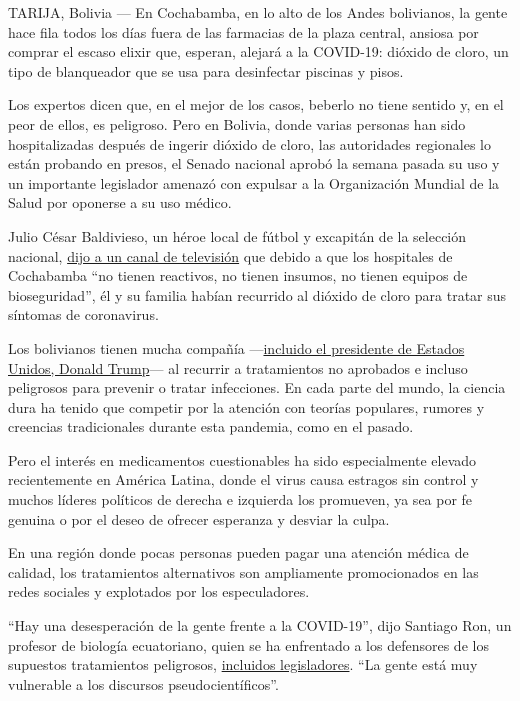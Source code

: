 TARIJA, Bolivia --- En Cochabamba, en lo alto de los Andes bolivianos,
la gente hace fila todos los días fuera de las farmacias de la plaza
central, ansiosa por comprar el escaso elixir que, esperan, alejará a la
COVID-19: dióxido de cloro, un tipo de blanqueador que se usa para
desinfectar piscinas y pisos.

Los expertos dicen que, en el mejor de los casos, beberlo no tiene
sentido y, en el peor de ellos, es peligroso. Pero en Bolivia, donde
varias personas han sido hospitalizadas después de ingerir dióxido de
cloro, las autoridades regionales lo están probando en presos, el Senado
nacional aprobó la semana pasada su uso y un importante legislador
amenazó con expulsar a la Organización Mundial de la Salud por oponerse
a su uso médico.

Julio César Baldivieso, un héroe local de fútbol y excapitán de la
selección nacional,
\href{https://www.facebook.com/watch/live/?v=214675996308544\&ref=watch_permalink}{dijo
a un canal de televisión} que debido a que los hospitales de Cochabamba
``no tienen reactivos, no tienen insumos, no tienen equipos de
bioseguridad'', él y su familia habían recurrido al dióxido de cloro
para tratar sus síntomas de coronavirus.

Los bolivianos tienen mucha compañía
---\href{https://www.nytimes.com/2020/06/03/health/hydroxychloroquine-coronavirus-trump.html}{incluido
el presidente de Estados Unidos, Donald Trump}--- al recurrir a
tratamientos no aprobados e incluso peligrosos para prevenir o tratar
infecciones. En cada parte del mundo, la ciencia dura ha tenido que
competir por la atención con teorías populares, rumores y creencias
tradicionales durante esta pandemia, como en el pasado.

Pero el interés en medicamentos cuestionables ha sido especialmente
elevado recientemente en América Latina, donde el virus causa estragos
sin control y muchos líderes políticos de derecha e izquierda los
promueven, ya sea por fe genuina o por el deseo de ofrecer esperanza y
desviar la culpa.

En una región donde pocas personas pueden pagar una atención médica de
calidad, los tratamientos alternativos son ampliamente promocionados en
las redes sociales y explotados por los especuladores.

``Hay una desesperación de la gente frente a la COVID-19'', dijo
Santiago Ron, un profesor de biología ecuatoriano, quien se ha
enfrentado a los defensores de los supuestos tratamientos peligrosos,
\href{https://www.facebook.com/jambato/posts/10223907884827653}{incluidos
legisladores}. ``La gente está muy vulnerable a los discursos
pseudocientíficos''.

